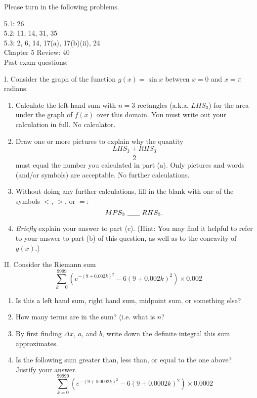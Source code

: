 \documentclass[12pt,twoside]{article}
\newcommand{\blank}[1]{\underline{\hspace{#1}}}
\begin{document}
Please turn in the following problems. 

5.1: 26 \\

5.2: 11, 14, 31, 35\\

5.3: 2, 6, 14, 17(a), 17(b)(ii), 24 \\

Chapter 5 Review: 40 \\

Past exam questions: 

I. Consider the graph of the function $g(x)=\sin x$ between $x=0$ and $x=\pi$ radians.

\begin{enumerate}
 \item Calculate the left-hand sum with $n=3$ rectangles (a.k.a. $LHS_3$) for the area under the graph of $f(x)$ over this domain.  You must write out your calculation in full.  No calculator.
 \item Draw one or more pictures to explain why the quantity $$\frac{LHS_3 + RHS_3}{2}$$ must equal the number you calculated in part (a).  Only pictures and words (and/or symbols) are acceptable.  No further calculations.
 \item Without doing any further calculations, fill in the blank with one of the symbols $<$, $>$, or $=$: $$MPS_3\mbox{ \blank{0.25in} }RHS_3.$$
 \item \emph{Briefly} explain your answer to part (c).  (Hint: You may find it helpful to refer to your answer to part (b) of this question, as well as to the concavity of $g(x)$.)
\end{enumerate}


II.  Consider the Riemann sum $$\sum_{k=0}^{9999} \left(e^{-(9+0.002k)^2} - 6(9+0.002k)^2\right)\times 0.002$$
\begin{enumerate}
 \item Is this a left hand sum, right hand sum, midpoint sum, or something else?
 \item How many terms are in the sum?  (i.e. what is $n$?
 \item By first finding $\Delta x$, $a$, and $b$, write down the definite integral this sum approximates.
 \item Is the following sum greater than, less than, or equal to the one above?  Justify your answer.
$$\sum_{k=0}^{99999} \left(e^{-(9+0.0002k)^2} - 6(9+0.0002k)^2\right)\times 0.0002$$\vfill
\end{enumerate}
\end{document}
